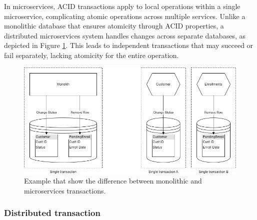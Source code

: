 In microservices, ACID transactions apply to local operations within a single microservice,
complicating atomic operations across multiple services. Unlike a monolithic database that ensures
atomicity through ACID properties, a distributed microservices system handles changes across
separate databases, as depicted in Figure \ref{fig:3_transaction}. This leads to independent
transactions that may succeed or fail separately, lacking atomicity for the entire operation.


\begin{figure}
    \centering
    \includegraphics[scale=0.5]{Pictures/3_transaction.png}
    \caption{Example that show the difference between monolithic and microservices transactions.}
    \label{fig:3_transaction}
\end{figure}

\subsubsection{Distributed transaction}

